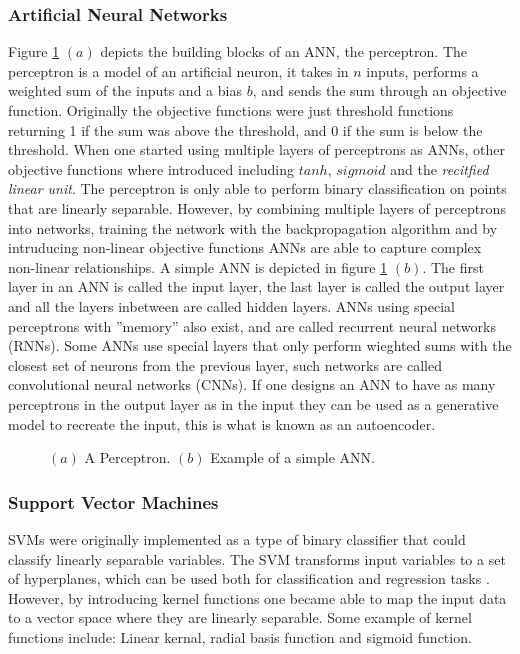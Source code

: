 \newpage
\subsubsection*{Artificial Neural Networks}
Figure \ref{fig:perc_nn} $(a)$ depicts the building blocks of an ANN, the perceptron. 
The perceptron is a model of an artificial neuron, it takes in $n$ inputs, performs a weighted sum of the inputs and a bias $b$, and sends the sum through an objective function. 
Originally the objective functions were just threshold functions returning 1 if the sum was above the threshold, and 0 if the sum is below the threshold. 
When one started using multiple layers of perceptrons as ANNs, other objective functions where introduced including $tanh$, $sigmoid$ and the \textit{recitfied linear unit}. 
The perceptron is only able to perform binary classification on points that are linearly separable. 
However, by combining multiple layers of perceptrons into networks, training the network with the backpropagation algorithm and by intruducing non-linear objective functions ANNs are able to capture complex non-linear relationships.
A simple ANN is depicted in figure \ref{fig:perc_nn} $(b)$. 
The first layer in an ANN is called the input layer, the last layer is called the output layer and all the layers inbetween are called hidden layers.
ANNs using special perceptrons with ''memory'' also exist, and are called recurrent neural networks (RNNs). 
Some ANNs use special layers that only perform wieghted sums with the closest set of neurons from the previous layer, such networks are called convolutional neural networks (CNNs).
If one designs an ANN to have as many perceptrons in the output layer as in the input they can be used as a generative model to recreate the input, this is what is known as an autoencoder.

\begin{figure}
\begin{center}
    
\end{center}
\caption{$(a)$ A Perceptron. $(b)$ Example of a simple ANN.} 
\label{fig:perc_nn}
\end{figure}

\subsubsection*{Support Vector Machines}
SVMs were originally implemented as a type of binary classifier that could classify linearly separable variables.
The SVM transforms input variables to a set of hyperplanes, which can be used both for classification and regression tasks \cite{svm_wikipedia}. 
However, by introducing kernel functions one became able to map the input data to a vector space where they are linearly separable.
Some example of kernel functions include: Linear kernal, radial basis function and sigmoid function. 


